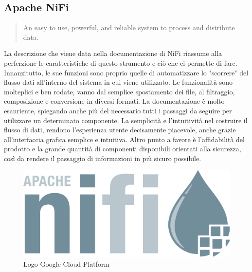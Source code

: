 \subsection{Apache NiFi}
\begin{quotation}
An easy to use, powerful, and reliable system to process and distribute data.
\end{quotation}
La descrizione che viene data nella documentazione di NiFi \cite{NiFi} riassume alla perferzione le caratteristiche di questo strumento e ciò che ci permette di fare.
\\Innanzitutto, le sue funzioni sono proprio quelle di automatizzare lo "scorrere" del flusso dati all'interno del sistema in cui viene utilizzato. Le funzionalità sono molteplici e ben rodate, vanno dal semplice spostamento dei file, al filtraggio, composizione e conversione in diversi formati. La documentazione è molto esauriente, spiegando anche più del necessario tutti i passaggi da seguire per utilizzare un determinato componente. La semplicità e l'intuitività nel costruire il flusso di dati, rendono l'esperienza utente decisamente piacevole, anche grazie all'interfaccia grafica semplice e intuitiva. Altro punto a favore è l'affidabilità del prodotto e la grande quantità di componenti disponibili orientati alla sicurezza, così da rendere il passaggio di informazioni in più sicuro possibile.
\begin{figure}[h!]
	\centering
	\includegraphics[scale=0.1]{figures/apache-nifi-logo}
	\caption[Logo Google Cloud Platform.]{Logo Google Cloud Platform
		\label{fig:logoGCP}}
\end{figure}	
